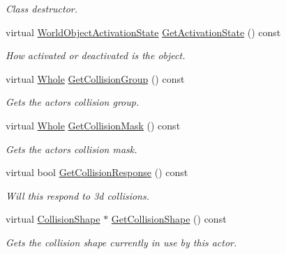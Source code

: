 \begin{DoxyCompactItemize}
\begin{DoxyCompactList}\small\item\em Class destructor. \item\end{DoxyCompactList}\item 
virtual \hyperlink{namespaceMezzanine_ac4d9d4570b1963390325ad6a083108e1}{WorldObjectActivationState} \hyperlink{classMezzanine_1_1WorldObjectPhysicsSettings_a4ff60fa3c81d63816b5014d80ec57f26}{GetActivationState} () const 
\begin{DoxyCompactList}\small\item\em How activated or deactivated is the object. \item\end{DoxyCompactList}\item 
virtual \hyperlink{namespaceMezzanine_adcbb6ce6d1eb4379d109e51171e2e493}{Whole} \hyperlink{classMezzanine_1_1WorldObjectPhysicsSettings_a7a3daebdb7d7a40116b1869c59441d2c}{GetCollisionGroup} () const 
\begin{DoxyCompactList}\small\item\em Gets the actors collision group. \item\end{DoxyCompactList}\item 
virtual \hyperlink{namespaceMezzanine_adcbb6ce6d1eb4379d109e51171e2e493}{Whole} \hyperlink{classMezzanine_1_1WorldObjectPhysicsSettings_ad1c74e07047aeebe5fa60504a03a20b9}{GetCollisionMask} () const 
\begin{DoxyCompactList}\small\item\em Gets the actors collision mask. \item\end{DoxyCompactList}\item 
virtual bool \hyperlink{classMezzanine_1_1WorldObjectPhysicsSettings_ab875f0480dbde3dd97a26ddf89bdb6c4}{GetCollisionResponse} () const 
\begin{DoxyCompactList}\small\item\em Will this respond to 3d collisions. \item\end{DoxyCompactList}\item 
virtual \hyperlink{classMezzanine_1_1CollisionShape}{CollisionShape} $\ast$ \hyperlink{classMezzanine_1_1WorldObjectPhysicsSettings_aed89696d6b5f42299d6853dee302bf16}{GetCollisionShape} () const 
\begin{DoxyCompactList}\small\item\em Gets the collision shape currently in use by this actor. \item\end{DoxyCompactList}\item 

\end{DoxyCompactItemize}
